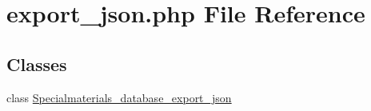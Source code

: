 \hypertarget{export__json_8php}{\section{export\+\_\+json.\+php File Reference}
\label{export__json_8php}
}
\subsection*{Classes}
\begin{DoxyCompactItemize}
\item 
class \hyperlink{classSpecialmaterials__database__export__json}{Specialmaterials\+\_\+database\+\_\+export\+\_\+json}
\end{DoxyCompactItemize}
